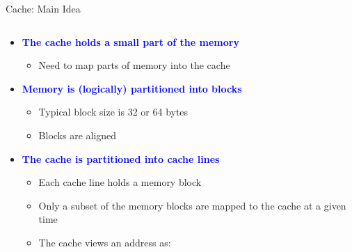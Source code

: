 \documentclass[aspectratio=169,12pt]{beamer}
\begin{document}
\begin{frame}{Cache: Main Idea}
\begin{columns}[T]
\begin{column}{0.65\textwidth}
\begin{itemize}
  \item \textcolor{blue}{\textbf{The cache holds a small part of the memory}}
  \begin{itemize}
    \item Need to map parts of memory into the cache
  \end{itemize}
  
  \item \textcolor{blue}{\textbf{Memory is (logically) partitioned into blocks}}
  \begin{itemize}
    \item Typical block size is 32 or 64 bytes
    \item Blocks are aligned
  \end{itemize}
  
  \item \textcolor{blue}{\textbf{The cache is partitioned into cache lines}}
  \begin{itemize}
    \item Each cache line holds a memory block
    \item Only a subset of the memory blocks are mapped to the cache at a given time
    \item The cache views an address as:
  \end{itemize}
\end{itemize}

\begin{center}
\end{center}
\end{column}


\end{columns}
\end{frame}
\end{document}
